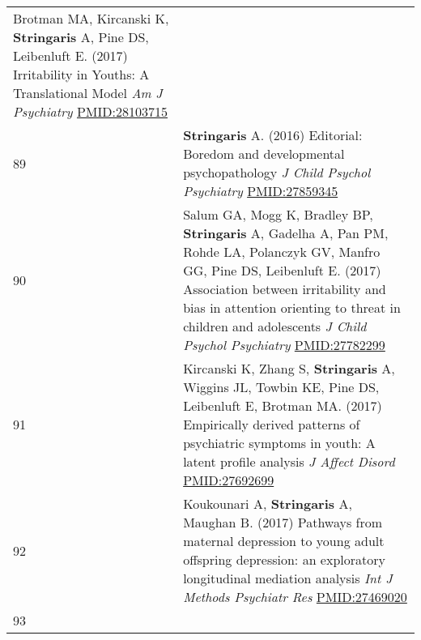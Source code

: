 \documentclass[
]{article}
\begin{document}
\begin{longtable}[]{@{}ll@{}}
\begin{minipage}[t]{0.94\columnwidth}
Brotman MA, Kircanski K, \textbf{Stringaris} A, Pine DS, Leibenluft E.
(2017) Irritability in Youths: A Translational Model \emph{Am J
Psychiatry} \url{PMID:28103715}\strut
\end{minipage}\tabularnewline
\begin{minipage}[t]{0.01\columnwidth}\raggedright
89\strut
\end{minipage} & \begin{minipage}[t]{0.94\columnwidth}\raggedright
\textbf{Stringaris} A. (2016) Editorial: Boredom and developmental
psychopathology \emph{J Child Psychol Psychiatry}
\url{PMID:27859345}\strut
\end{minipage}\tabularnewline
\begin{minipage}[t]{0.01\columnwidth}\raggedright
90\strut
\end{minipage} & \begin{minipage}[t]{0.94\columnwidth}\raggedright
Salum GA, Mogg K, Bradley BP, \textbf{Stringaris} A, Gadelha A, Pan PM,
Rohde LA, Polanczyk GV, Manfro GG, Pine DS, Leibenluft E. (2017)
Association between irritability and bias in attention orienting to
threat in children and adolescents \emph{J Child Psychol Psychiatry}
\url{PMID:27782299}\strut
\end{minipage}\tabularnewline
\begin{minipage}[t]{0.01\columnwidth}\raggedright
91\strut
\end{minipage} & \begin{minipage}[t]{0.94\columnwidth}\raggedright
Kircanski K, Zhang S, \textbf{Stringaris} A, Wiggins JL, Towbin KE, Pine
DS, Leibenluft E, Brotman MA. (2017) Empirically derived patterns of
psychiatric symptoms in youth: A latent profile analysis \emph{J Affect
Disord} \url{PMID:27692699}\strut
\end{minipage}\tabularnewline
\begin{minipage}[t]{0.01\columnwidth}\raggedright
92\strut
\end{minipage} & \begin{minipage}[t]{0.94\columnwidth}\raggedright
Koukounari A, \textbf{Stringaris} A, Maughan B. (2017) Pathways from
maternal depression to young adult offspring depression: an exploratory
longitudinal mediation analysis \emph{Int J Methods Psychiatr Res}
\url{PMID:27469020}\strut
\end{minipage}\tabularnewline
\begin{minipage}[t]{0.01\columnwidth}\raggedright
93\strut
\end{minipage} & \begin{minipage}[t]{0.94\columnwidth}\raggedright

\end{minipage}
\end{longtable}
\end{document}
